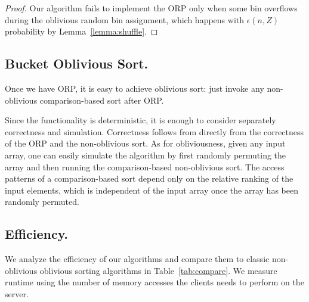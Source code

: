 \begin{proof}
Our algorithm fails to implement the ORP only when some bin overflows during the oblivious random bin assignment, which happens with $\epsilon(n,Z)$ probability by Lemma~\ref{lemma:shuffle}.
\end{proof}

\subsection{Bucket Oblivious Sort.}
\label{sec:osort}
Once we have ORP, it is easy to achieve oblivious sort: just invoke any non-oblivious comparison-based sort after ORP.

Since the functionality is deterministic, it is enough to consider separately correctness and simulation. Correctness follows from directly from the correctness of the ORP and the non-oblivious sort. As for obliviousness, given any input array, one can easily simulate the algorithm by first randomly permuting the array and then running the comparison-based non-oblivious sort. 
The access patterns of a comparison-based sort depend only on the relative ranking of the input elements, which is independent of the input array once the array has been randomly permuted. 

\subsection{Efficiency.}
\label{sec:efficiency}

We analyze the efficiency of our algorithms and compare them to classic non-oblivious oblivious sorting algorithms in Table~\ref{tab:compare}.
We measure runtime using the number of memory accesses the clients needs to perform on the server.





